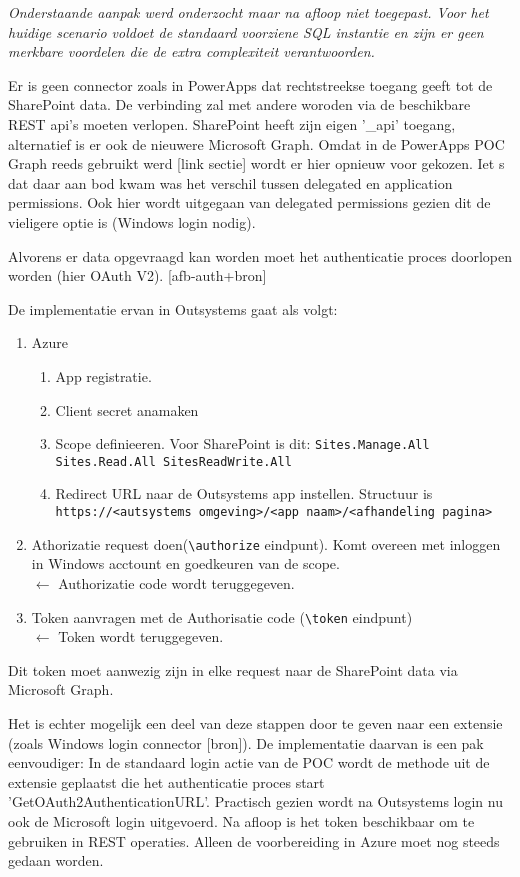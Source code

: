 \textit{Onderstaande aanpak werd onderzocht maar na afloop niet toegepast. Voor het huidige scenario voldoet de standaard voorziene SQL instantie en zijn er geen merkbare voordelen die de extra complexiteit verantwoorden.}

Er is geen connector zoals in PowerApps dat rechtstreekse toegang geeft tot de SharePoint data. De verbinding zal met andere woroden via de beschikbare REST api's moeten verlopen. SharePoint heeft zijn eigen '\_api' toegang, alternatief is er ook de nieuwere Microsoft Graph. Omdat in de PowerApps POC Graph reeds gebruikt werd [link sectie] wordt er hier opnieuw voor gekozen. Iet s dat daar aan bod kwam was het verschil tussen delegated en application permissions. Ook hier wordt uitgegaan van delegated permissions gezien dit de vieligere optie is (Windows login nodig).

Alvorens er data opgevraagd kan worden moet het authenticatie proces doorlopen worden (hier OAuth V2).
[afb-auth+bron]

De implementatie ervan in Outsystems gaat als volgt:
\begin{enumerate}
    \item Azure
    \begin{enumerate}
        \item App registratie.
        \item Client secret anamaken
        \item Scope definieeren. Voor SharePoint is dit: \lstinline|Sites.Manage.All Sites.Read.All SitesReadWrite.All|
        \item Redirect URL naar de Outsystems app instellen. Structuur is \lstinline|https://<autsystems omgeving>/<app naam>/<afhandeling pagina>| 
    \end{enumerate}
    \item Athorizatie request doen(\lstinline|\authorize| eindpunt). Komt overeen met inloggen in Windows acctount en goedkeuren van de scope.\\
    $\leftarrow$ Authorizatie code wordt teruggegeven.
    \item Token aanvragen met de Authorisatie code (\lstinline|\token| eindpunt)\\
    $\leftarrow$ Token wordt teruggegeven.
\end{enumerate}
Dit token moet aanwezig zijn in elke request naar de SharePoint data via Microsoft Graph.

Het is echter mogelijk een deel van deze stappen door te geven naar een extensie (zoals Windows login connector [bron]). De implementatie daarvan is een pak eenvoudiger: In de standaard login actie van de POC wordt de methode uit de extensie geplaatst die het authenticatie proces start 'GetOAuth2AuthenticationURL'. Practisch gezien wordt na Outsystems login nu ook de Microsoft login uitgevoerd. Na afloop is het token beschikbaar om te gebruiken in REST operaties. Alleen de voorbereiding in Azure moet nog steeds gedaan worden.



